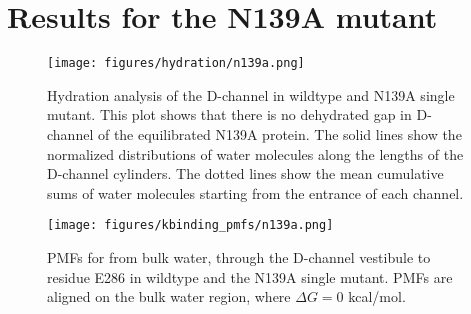 \chapter{Results for the N139A mutant}

\begin{figure}[htbp]
\centering
\texttt{[image: figures/hydration/n139a.png]}
\caption[Hydration analysis of the D-channel in wildtype and N139A single mutant.]{Hydration analysis of the D-channel in wildtype and N139A single mutant. This plot shows that there is no dehydrated gap in D-channel of the equilibrated N139A protein. The solid lines show the normalized distributions of water molecules along the lengths of the D-channel cylinders. The dotted lines show the mean cumulative sums of water molecules starting from the entrance of each channel.}
\label{fig:hydration_n139a}
\end{figure}

\begin{figure}[htbp]
\centering
\texttt{[image: figures/kbinding\_pmfs/n139a.png]}
\caption[PMFs for  from bulk water, through the D-channel vestibule to residue E286 in wildtype and the N139A single mutant.]{PMFs for  from bulk water, through the D-channel vestibule to residue E286 in wildtype and the N139A single mutant. PMFs are aligned on the bulk water region, where $\Delta G = 0$ kcal/mol.}
\label{fig:pmfs_kbinding_n139a}
\end{figure}